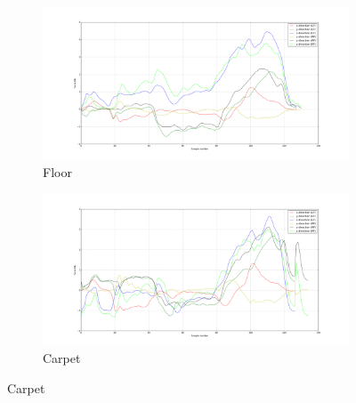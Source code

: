 \documentclass[USenglish]{ifimaster}  %
\begin{document}
		\begin{figure} [h]
		\centering
		\begin{subfigure}[b]{\textwidth}
			\includegraphics[width=\textwidth,height=\textheight,keepaspectratio]{Figures/s1gulvtd}
			\caption{Floor}
			\label{fig:gulvgraf} 
		\end{subfigure}
		
		\begin{subfigure}[b]{\textwidth}
			\includegraphics[width=\textwidth,height=\textheight,keepaspectratio]{Figures/s1teppetd}
			\caption{Carpet}
			\label{fig:teppegraf}
		\end{subfigure}
		
	\end{figure}
\end{document}
